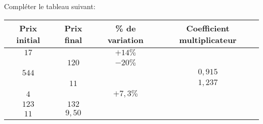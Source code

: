 \documentclass[a4paper]{article}
\renewcommand\euro{\officialeuro\xspace}
\begin{document}
  \begin{exercice}{}{}
  Compléter le tableau suivant:
  
  \begin{center}
    \begin{tabular}{|c|c|c|c|}
      \hline 
      \cellcolor{Blue!15!white}\textbf{Prix initial} & \cellcolor{Blue!15!white}\textbf{Prix final} & \cellcolor{Blue!15!white}\textbf{\% de variation} & \cellcolor{Blue!15!white}\textbf{Coefficient multiplicateur} \\
      \hline
      $17$\euro & & $+14\%$ & \\
      \hline
      & $120$\euro&  $-20\%$& \\
      \hline
      $544$\euro& & & $0,915$\\
      \hline
      & $11$\euro& & $1,237$\\
      \hline
      $4$\euro& & $+7,3\%$& \\
      \hline
      $123$\euro& $132$\euro & & \\
      \hline
      $11$\euro& $9,50$\euro& & \\
      \hline
    \end{tabular}
  \end{center}
      
  \end{exercice}
  
\end{document}
